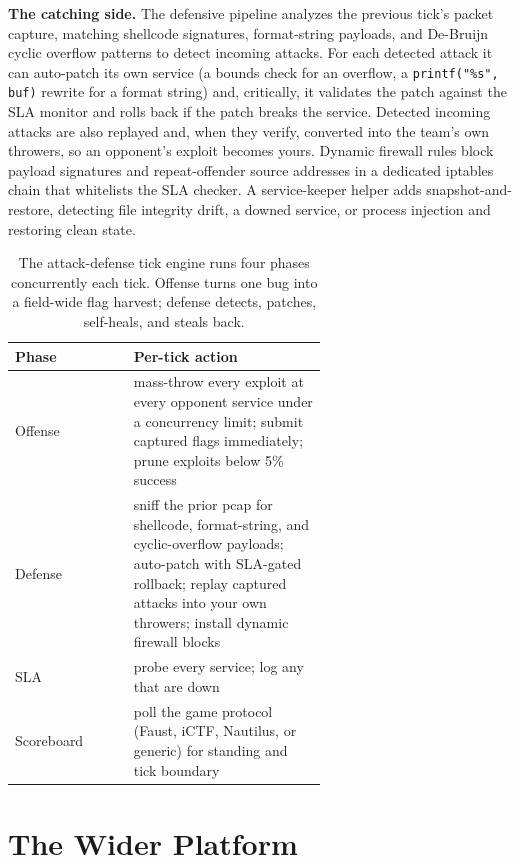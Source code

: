 \documentclass[10pt,twocolumn]{article}
\begin{document}
\medskip
\textbf{The catching side.} The defensive pipeline analyzes the previous tick's packet capture, matching
shellcode signatures, format-string payloads, and De-Bruijn cyclic overflow patterns to detect incoming
attacks. For each detected attack it can auto-patch its own service (a bounds check for an overflow, a
\texttt{printf("\%s", buf)} rewrite for a format string) and, critically, it validates the patch against
the SLA monitor and rolls back if the patch breaks the service. Detected incoming attacks are also replayed
and, when they verify, converted into the team's own throwers, so an opponent's exploit becomes yours.
Dynamic firewall rules block payload signatures and repeat-offender source addresses in a dedicated iptables
chain that whitelists the SLA checker. A service-keeper helper adds snapshot-and-restore, detecting file
integrity drift, a downed service, or process injection and restoring clean state.

\begin{table}[t]
  \centering\small
  \setlength{\tabcolsep}{5pt}\renewcommand{\arraystretch}{1.18}
  \begin{tabular}{@{}l p{0.62\linewidth}@{}}
    \toprule
    \textbf{Phase} & \textbf{Per-tick action} \\
    \midrule
    Offense   & mass-throw every exploit at every opponent service under a concurrency limit; submit captured flags immediately; prune exploits below 5\% success \\
    Defense   & sniff the prior pcap for shellcode, format-string, and cyclic-overflow payloads; auto-patch with SLA-gated rollback; replay captured attacks into your own throwers; install dynamic firewall blocks \\
    SLA       & probe every service; log any that are down \\
    Scoreboard & poll the game protocol (Faust, iCTF, Nautilus, or generic) for standing and tick boundary \\
    \bottomrule
  \end{tabular}
  \caption{The attack-defense tick engine runs four phases concurrently each tick. Offense turns one bug
  into a field-wide flag harvest; defense detects, patches, self-heals, and steals back.}
  \label{tab:ad}
\end{table}

\section{The Wider Platform}
\label{sec:platform}
\end{document}
